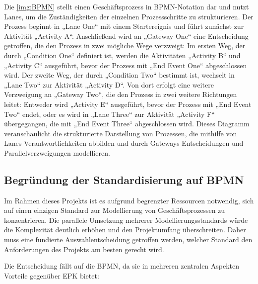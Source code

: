 Die \autoref{img:BPMN} stellt einen Geschäftsprozess in \ac{BPMN}-Notation dar und nutzt Lanes, um die Zuständigkeiten der einzelnen Prozessschritte zu strukturieren. Der Prozess beginnt in „Lane One“ mit einem Startereignis und führt zunächst zur Aktivität „Activity A“. Anschließend wird an „Gateway One“ eine Entscheidung getroffen, die den Prozess in zwei mögliche Wege verzweigt: Im ersten Weg, der durch „Condition One“ definiert ist, werden die Aktivitäten „Activity B“ und „Activity C“ ausgeführt, bevor der Prozess mit „End Event One“ abgeschlossen wird. Der zweite Weg, der durch „Condition Two“ bestimmt ist, wechselt in „Lane Two“ zur Aktivität „Activity D“. Von dort erfolgt eine weitere Verzweigung an „Gateway Two“, die den Prozess in zwei weitere Richtungen leitet: Entweder wird „Activity E“ ausgeführt, bevor der Prozess mit „End Event Two“ endet, oder es wird in „Lane Three“ zur Aktivität „Activity F“ übergegangen, die mit „End Event Three“ abgeschlossen wird. Dieses Diagramm veranschaulicht die strukturierte Darstellung von Prozessen, die mithilfe von Lanes Verantwortlichkeiten abbilden und durch Gateways Entscheidungen und Parallelverzweigungen modellieren.

\subsection*{Begründung der Standardisierung auf \ac{BPMN}}
 
Im Rahmen dieses Projekts ist es aufgrund begrenzter Ressourcen notwendig, sich auf einen einzigen Standard zur Modellierung von Geschäftsprozessen zu konzentrieren. Die parallele Umsetzung mehrerer Modellierungsstandards würde die Komplexität deutlich erhöhen und den Projektumfang überschreiten. Daher muss eine fundierte Auswahlentscheidung getroffen werden, welcher Standard den Anforderungen des Projekts am besten gerecht wird.
 
Die Entscheidung fällt auf die \ac{BPMN}, da sie in mehreren zentralen Aspekten Vorteile gegenüber \ac{EPK} bietet:
 
